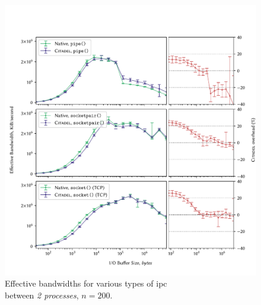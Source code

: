 \begin{figure}[]
    \centering
    \includegraphics[width=\linewidth]{figures/graphs/ipc-2proc.pdf}
    \vspace{-5mm}
    \captionsetup{justification=centering}
    \caption[Effective bandwidths for various types of IPC between \textit{2 processes}.]{Effective bandwidths for various types of \acrshort{ipc} \\ between \textit{2 processes}, $n=200$.}
    \label{fig:ipc-2proc-graph}
\end{figure}

\clearpage

